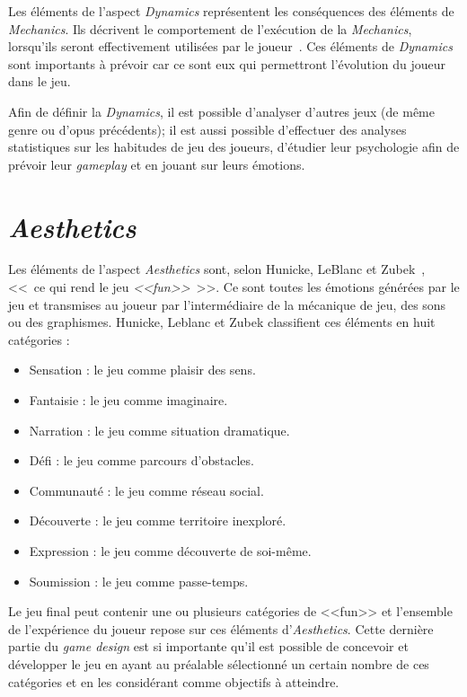 Les \'el\'ements de l'aspect \emph{Dynamics} repr\'esentent les conséquences des \'el\'ements de \emph{Mechanics}. 
Ils décrivent le comportement de l'exécution de la \emph{Mechanics}, lorsqu'ils seront effectivement utilisées par le joueur~\cite{GAMA_MDA}. 
Ces \'el\'ements de \emph{Dynamics} sont importants à prévoir car ce sont eux qui permettront l'évolution du joueur dans le jeu.

Afin de définir la \emph{Dynamics}, il est possible d'analyser d'autres jeux (de même genre ou d'opus précédents); il est aussi possible d'effectuer des analyses statistiques sur les habitudes de jeu des joueurs, d'étudier leur psychologie afin de prévoir leur \emph{gameplay} et en jouant sur leurs émotions.


\section{\emph{Aesthetics}}
Les \'el\'ements de l'aspect \emph{Aesthetics} sont, selon Hunicke, LeBlanc et Zubek~\cite{MDA_formal}, <<~ce qui rend le jeu \emph{<<fun>>}~>>. 
Ce sont toutes les émotions générées par le jeu et transmises au joueur par l'interm\'ediaire de la mécanique de jeu, des sons ou des graphismes. Hunicke, Leblanc et Zubek classifient ces \'el\'ements en huit catégories :
\begin{itemize}
    \item Sensation : le jeu comme plaisir des sens.
    \item Fantaisie : le jeu comme imaginaire.
    \item Narration : le jeu comme situation dramatique.
    \item D\'efi : le jeu comme parcours d'obstacles.
    \item Communauté : le jeu comme réseau social.
    \item Découverte : le jeu comme territoire inexploré.
    \item Expression : le jeu comme découverte de soi-même.
    \item Soumission : le jeu comme passe-temps.
\end{itemize}


Le jeu final peut contenir une ou plusieurs catégories de <<fun>> et l'ensemble de l'expérience du joueur repose sur ces \'el\'ements d'\emph{Aesthetics}. 
Cette dernière partie du \emph{game design} est si importante qu'il est possible de concevoir et développer le jeu en ayant au préalable sélectionné un certain nombre de ces catégories et en les considérant comme objectifs à atteindre.




